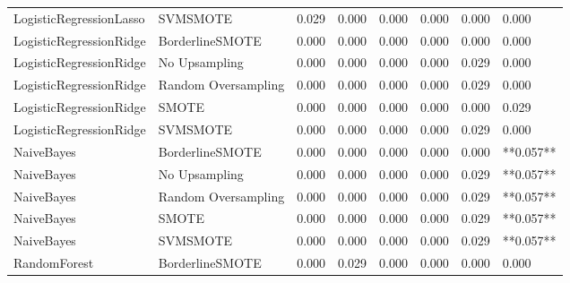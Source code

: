 \begin{tabular}{llllllll}
     LogisticRegressionLasso &            SVMSMOTE & 0.029 &                     0.000 &                 0.000 &                  0.000 &                                   0.000 &     0.000 \\
     LogisticRegressionRidge &     BorderlineSMOTE & 0.000 &                     0.000 &                 0.000 &                  0.000 &                                   0.000 &     0.000 \\
     LogisticRegressionRidge &       No Upsampling & 0.000 &                     0.000 &                 0.000 &                  0.000 &                                   0.029 &     0.000 \\
     LogisticRegressionRidge & Random Oversampling & 0.000 &                     0.000 &                 0.000 &                  0.000 &                                   0.029 &     0.000 \\
     LogisticRegressionRidge &               SMOTE & 0.000 &                     0.000 &                 0.000 &                  0.000 &                                   0.000 &     0.029 \\
     LogisticRegressionRidge &            SVMSMOTE & 0.000 &                     0.000 &                 0.000 &                  0.000 &                                   0.029 &     0.000 \\
                  NaiveBayes &     BorderlineSMOTE & 0.000 &                     0.000 &                 0.000 &                  0.000 &                                   0.000 & **0.057** \\
                  NaiveBayes &       No Upsampling & 0.000 &                     0.000 &                 0.000 &                  0.000 &                                   0.029 & **0.057** \\
                  NaiveBayes & Random Oversampling & 0.000 &                     0.000 &                 0.000 &                  0.000 &                                   0.029 & **0.057** \\
                  NaiveBayes &               SMOTE & 0.000 &                     0.000 &                 0.000 &                  0.000 &                                   0.029 & **0.057** \\
                  NaiveBayes &            SVMSMOTE & 0.000 &                     0.000 &                 0.000 &                  0.000 &                                   0.029 & **0.057** \\
                RandomForest &     BorderlineSMOTE & 0.000 &                     0.029 &                 0.000 &                  0.000 &                                   0.000 &     0.000 \\

\end{tabular}
